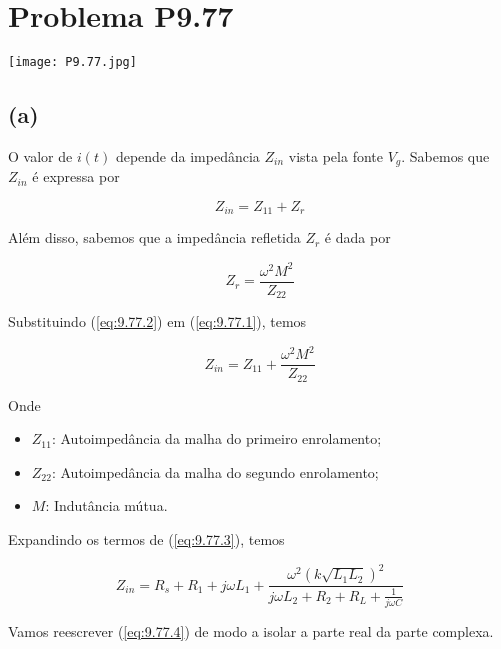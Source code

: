 
\section*{Problema P9.77}

\renewcommand*\thesection{9.77}

\begin{center}
    \texttt{[image: P9.77.jpg]}
\end{center}

\subsection*{(a)}

O valor de \(i(t)\) depende da impedância \(Z_{in}\) vista pela fonte \(V_{g}\).
Sabemos que \(Z_{in}\) é expressa por

\begin{equation}\label{eq:9.77.1}
    Z_{in} = Z_{11} + Z_{r}
\end{equation}

Além disso, sabemos que a impedância refletida \(Z_{r}\) é dada por

\begin{equation}\label{eq:9.77.2}
    Z_{r} = \frac{\omega^2M^2}{Z_{22}}
\end{equation}

Substituindo (\ref{eq:9.77.2}) em (\ref{eq:9.77.1}), temos

\begin{equation}\label{eq:9.77.3}
    Z_{in} = Z_{11} + \frac{\omega^2M^2}{Z_{22}}
\end{equation}

Onde
\begin{itemize}
    \item \(Z_{11}\): Autoimpedância da malha do primeiro enrolamento;
    \item \(Z_{22}\): Autoimpedância da malha do segundo enrolamento;
    \item \(M\): Indutância mútua.
\end{itemize}

Expandindo os termos de (\ref{eq:9.77.3}), temos

\begin{equation}\label{eq:9.77.4}
    Z_{in} = R_s + R_1 + j \omega L_1 + \frac{\omega^2(k\sqrt{L_1L_2})^2}{j\omega L_2 + R_2 + R_L + \frac{1}{j\omega C}}
\end{equation}

Vamos reescrever (\ref{eq:9.77.4}) de modo a isolar a parte real da parte complexa.

